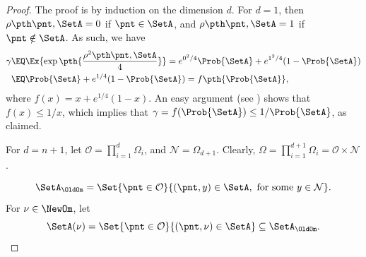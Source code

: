 \begin{proof}
    The proof is by induction on the dimension $d$. For $d=1$, then
    $\distTY{\pnt}{\SetA} = 0$ if $\pnt \in \SetA$, and
    $\distTY{\pnt}{\SetA}= 1$ if $\pnt \notin \SetA$. As such, we have
    \begin{align*}
        \gamma
        &\EQ
        \Ex{ \exp \pth{\frac{\distTSqY{\pnt}{\SetA} }{4}}}%
        =%
        e^{0^2/4} \Prob{\SetA} + e^{1^2/4} (1-\Prob{\SetA})
        \\&
        \EQ%
        \Prob{\SetA} + e^{1/4}(1-\Prob{\SetA})= f\pth{\Prob{\SetA}},
    \end{align*}                   
    where $f(x) = x + e^{1/4}(1-x)$. An easy argument (see
    ) shows that $f(x) \leq 1/x$, which implies
    that $\gamma = f(\Prob{\SetA}) \leq 1/ \Prob{\SetA}$, as claimed.
    
    For $d=n+1$, let $\mathcal{O} = \prod_{i=1}^d \Omega_i$, and
    $\mathcal{N} = \Omega_{d+1}$. Clearly,
    $\Omega =\prod_{i=1}^{d+1} \Omega_i = \mathcal{O} \times
    \mathcal{N}$.

    \begin{equation*}
        \SetA_\OldOm  =
        \Set{ \pnt \in \mathcal{O} }{ (\pnt,y) \in \SetA, \text{ for
              some } y \in \mathcal{N}}.
    \end{equation*}
    For $\nu \in \NewOm$, let 
    \begin{equation*}
        \SetA(\nu)%
        =%
        \Set{ \pnt \in \mathcal{O} }{ (\pnt,\nu) \in \SetA } \subseteq
        \SetA_\OldOm .
    \end{equation*}


\end{proof}

